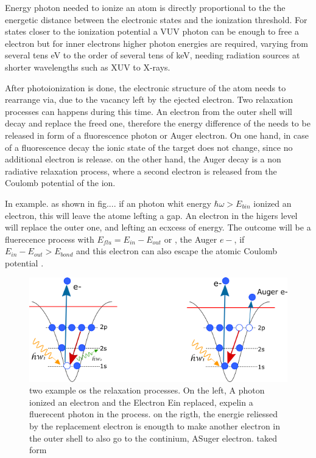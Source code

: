 Energy photon needed to ionize an atom is directly proportional to the  the energetic distance between the electronic states and the ionization threshold. For  states closer to the ionization potential a  VUV photon can be enough to free a electron but for inner electrons  higher photon energies are required, varying from several tens eV to the order of several tens of keV, needing radiation sources at shorter wavelengths such as XUV to X-rays.\cite{becker_vuv_1996}

After photoionization is done, the electronic structure of the atom needs to rearrange via, due to the vacancy left by the ejected electron. Two relaxation processes can happens during this time. An electron from the outer shell will decay and replace the freed one, therefore the energy difference of the needs to be released in form of a fluorescence photon or Auger electron. On one hand, in case of a fluorescence decay the ionic state of the target does not change, since no additional electron is release. on the other hand, the Auger decay is a non radiative relaxation process, where a second electron is released from the Coulomb potential of the ion.

In example. as shown in fig.... if an photon  whit energy $\hbar\omega > E_{bin}$  ionized an electron, this will leave the atome lefting a gap. An electron in the higers level will replace the outer one, and lefting an ecxcess of energy. The outcome will be a fluerecence process with $E_{flu} = E_{in}- E_{out}$ or , the Auger $e-$, if $ E_{in}-E_{out} > E_{bond}$ and this electron can also escape the atomic Coulomb potential \cite{schmidt_electron_1997}.

\begin{figure}[hbtp] \label{fig:augerfluorec}
\centering
\includegraphics[width=6 cm]{../Images/text6418.png}
\caption[Relaxation processes for photoionization]{two example os the relaxation processes. On the left, A photon ionized an electron and the Electron Ein replaced, expelin a fluerecent photon in the process. on the rigth, the energie reliessed by the replacement electron is enougth to make another electron in the outer shell to also go to the continium, ASuger electron. taked form \cite{rafipoor_two-color_2017}}
\end{figure}

